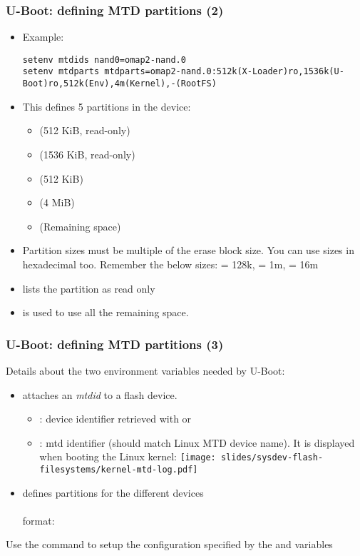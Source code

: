 \begin{frame}[fragile]
  \frametitle{U-Boot: defining MTD partitions (2)}
  \begin{itemize}
  \item Example:
  {\tiny
  \begin{verbatim}
setenv mtdids nand0=omap2-nand.0
setenv mtdparts mtdparts=omap2-nand.0:512k(X-Loader)ro,1536k(U-Boot)ro,512k(Env),4m(Kernel),-(RootFS)
  \end{verbatim}
  }
  \item This defines 5 partitions in the  device:
    \begin{itemize}
    \item {} (512 KiB, read-only)
    \item {} (1536 KiB, read-only)
    \item {} (512 KiB)
    \item {} (4 MiB)
    \item {} (Remaining space)
    \end{itemize}
  \item Partition sizes must be multiple of the erase block size.
    You can use sizes in hexadecimal too. Remember the below sizes:
     = 128k,  = 1m,  = 16m
  \item {} lists the partition as read only
  \item \code{-} is used to use all the remaining space.
  \end{itemize}
\end{frame}


\begin{frame}[fragile]
  \frametitle{U-Boot: defining MTD partitions (3)}
  Details about the two environment variables needed by U-Boot:
  \begin{itemize}
  \item {} attaches an {\em mtdid} to a flash device.\\
    \begin{itemize}
    \item {}: device identifier retrieved with
       or 
    \item {}: mtd identifier (should match Linux MTD device
      name). It is displayed when booting the Linux kernel:
    \texttt{[image: slides/sysdev-flash-filesystems/kernel-mtd-log.pdf]}\\
    \end{itemize}
  \item {} defines partitions for the different devices\\
  \\
   format: 
  \end{itemize}
  Use the  command to setup the configuration
  specified by the  and  variables
\end{frame}

